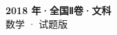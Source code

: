 \documentclass[zihao=-4, a4paper]{ctexart}
\begin{document}
\begin{center}
  {\Large\bfseries 2018 年·全国Ⅱ卷·文科}\\[4pt]
  {\large 数学 · 试题版}
\end{center}
\medskip
{}

\end{document}
